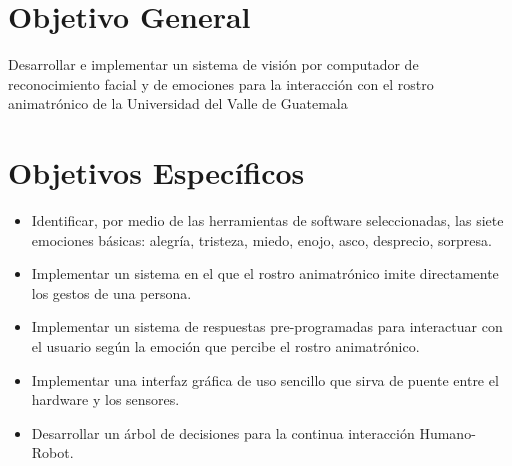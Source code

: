 \section{Objetivo General}
Desarrollar e implementar un sistema de visión por computador de reconocimiento facial y de emociones para la interacción con el rostro animatrónico de la Universidad del Valle de Guatemala

\section{Objetivos Específicos}
\begin{itemize}
\item Identificar, por medio de las herramientas de software seleccionadas, las siete emociones básicas: alegría, tristeza, miedo, enojo, asco, desprecio, sorpresa.
\item Implementar un sistema en el que el rostro animatrónico imite directamente los gestos de una persona.
\item Implementar un sistema de respuestas pre-programadas para interactuar con el usuario según la emoción que percibe el rostro animatrónico.
\item Implementar una interfaz gráfica de uso sencillo que sirva de puente entre el hardware y los sensores.
\item Desarrollar un árbol de decisiones para la continua interacción Humano-Robot.
\end{itemize}